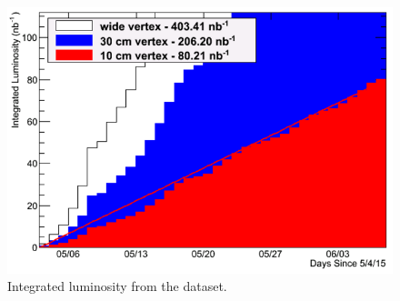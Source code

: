 \begin{figure}[!h]
\begin{center}
\includegraphics[width=0.65\linewidth]{figs/integrated_luminosity.png}
\caption{Integrated luminosity from the \pau dataset.}
\end{center}
\end{figure}






